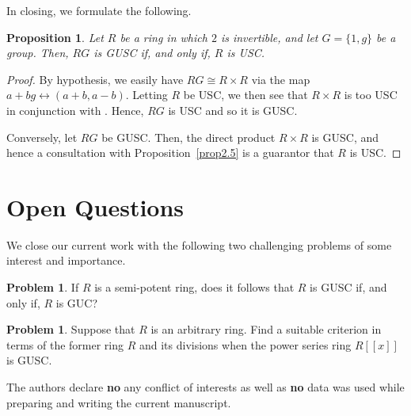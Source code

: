 \documentclass[12pt]{amsart}
\newtheorem{proposition}[theorem]{Proposition}
\theoremstyle{definition}
\newtheorem{problem}[theorem]{Problem}
\begin{document}
In closing, we formulate the following.

\begin{proposition}
Let $R$ be a ring in which $2$ is invertible, and let $G=\{1, g\}$ be a group. Then, $RG$ is GUSC if, and only if, $R$ is USC.
\end{proposition}

\begin{proof}
By hypothesis, we easily have $RG\cong R\times R$ via the map $a+bg \leftrightarrow (a+b, a-b)$. Letting $R$ be USC, we then see that $R\times R$ is too USC in conjunction with \cite[Example 2]{2}. Hence, $RG$ is USC and so it is GUSC.

Conversely, let $RG$ be GUSC. Then, the direct product $R\times R$ is GUSC, and hence a consultation with Proposition~\ref{prop2.5} is a guarantor that $R$ is USC.
\end{proof}

\section{Open Questions}

We close our current work with the following two challenging problems of some interest and importance.

\begin{problem}
If $R$ is a semi-potent ring, does it follows that $R$ is GUSC if, and only if, $R$ is GUC?
\end{problem}

\begin{problem}
Suppose that $R$ is an arbitrary ring. Find a suitable criterion in terms of the former ring $R$ and its divisions when the power series ring $R[[x]]$ is GUSC.
\end{problem}

\bigskip

 The authors declare {\bf no} any conflict of interests as well as {\bf no} data was used while preparing and writing the current manuscript.


\vskip3.0pc
\end{document}

